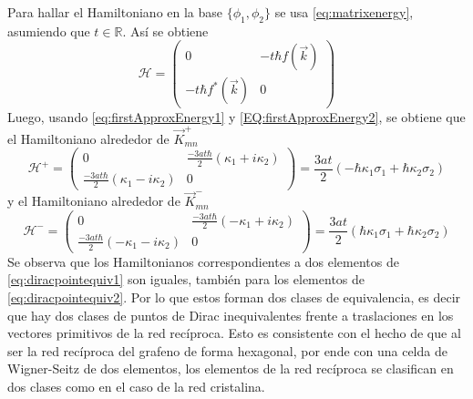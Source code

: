 Para hallar el Hamiltoniano en la base $\{\phi_1,\phi_2\}$ se usa \eqref{eq:matrixenergy}, asumiendo que $t \in \mathbb{R}$. Así se obtiene
\begin{equation}
	\mathcal{H} = \begin{pmatrix}
		0                         & -t\hbar f(\vec{k}) \\
		-t\hbar f^{\ast}(\vec{k}) & 0
	\end{pmatrix}\label{eq:reducedHamil}
\end{equation}
Luego, usando \eqref{eq:firstApproxEnergy1} y \eqref{EQ:firstApproxEnergy2}, se obtiene que el Hamiltoniano alrededor de $\vec{K}^{+}_{mn}$
\begin{equation}
	\mathcal{H}^{+} = \begin{pmatrix}
		0                                       & \frac{-3at\hbar}{2}(\kappa_1+i\kappa_2) \\
		\frac{-3at\hbar}{2}(\kappa_1-i\kappa_2) & 0
	\end{pmatrix} = \frac{3at}{2}\left(-\hbar\kappa_1\sigma_1+\hbar\kappa_2\sigma_2\right)\label{eq:diracHam1}
\end{equation}
y el Hamiltoniano alrededor de $\vec{K}^{-}_{mn}$
\begin{equation}
	\mathcal{H}^{-} = \begin{pmatrix}
		0                                        & \frac{-3at\hbar}{2}(-\kappa_1+i\kappa_2) \\
		\frac{-3at\hbar}{2}(-\kappa_1-i\kappa_2) & 0
	\end{pmatrix} = \frac{3at}{2}\left(\hbar\kappa_1\sigma_1+\hbar\kappa_2\sigma_2\right)\label{eq:diracHam2}
\end{equation}
Se observa que los Hamiltonianos correspondientes a dos elementos de \eqref{eq:diracpointequiv1} son iguales, también para los elementos de \eqref{eq:diracpointequiv2}. Por lo que estos forman dos clases de equivalencia, es decir que hay dos clases de puntos de Dirac inequivalentes frente a traslaciones en los vectores primitivos de la red recíproca. Esto es consistente con el hecho de que al ser la red recíproca del grafeno de forma hexagonal, por ende con una celda de Wigner-Seitz de dos elementos, los elementos de la red recíproca se clasifican en dos clases como en el caso de la red cristalina.\par

